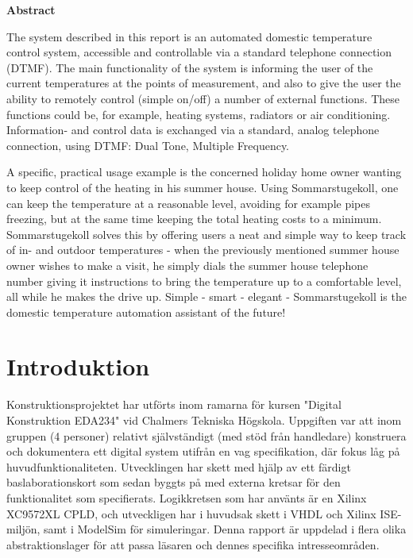 \documentclass[a4paper,11pt]{article}
\begin{document}

\begin{center}
{\noindent \bf Abstract}
\end{center}


	The system described in this report is an automated domestic temperature control system, accessible and controllable via
	a standard telephone connection (DTMF). The main functionality of the system is informing the user of the current temperatures
	at the points of measurement, and also to give the user the ability to remotely control (simple on/off) a number of external
	functions. These functions could be, for example, heating systems, radiators or air conditioning. Information- and control data
	is exchanged via a standard, analog telephone connection, using DTMF: Dual Tone, Multiple Frequency.

	A specific, practical usage example is the concerned holiday home owner wanting to keep control of the heating in his summer house.
	Using Sommarstugekoll, one can keep the temperature at a reasonable level, avoiding for example pipes freezing, but at the same time
	keeping the total heating costs to a minimum. Sommarstugekoll solves this by offering users a neat and simple way to keep track
	of in- and outdoor temperatures - when the previously mentioned summer house owner wishes to make a visit, he simply dials the
	summer house telephone number giving it instructions to bring the temperature up to a comfortable level, all while he makes
	the drive up. Simple - smart - elegant - Sommarstugekoll is the domestic temperature automation assistant of the future!


\pagebreak

\section{Introduktion}

	Konstruktionsprojektet har utförts inom ramarna för kursen "Digital Konstruktion EDA234" vid Chalmers Tekniska Högskola.
	Uppgiften var att inom gruppen (4 personer) relativt självständigt (med stöd från handledare) konstruera och dokumentera
	ett digital system utifrån en vag specifikation, där fokus låg på huvudfunktionaliteten.
	Utvecklingen har skett med hjälp av ett färdigt baslaborationskort som sedan byggts på med externa kretsar för den funktionalitet
	som specifierats. Logikkretsen som har använts är en Xilinx XC9572XL CPLD, och utveckligen har i huvudsak skett i VHDL och Xilinx ISE-miljön,
	samt i ModelSim för simuleringar. Denna rapport är uppdelad i flera olika abstraktionslager för att passa läsaren och dennes specifika intresseområden. 
\end{document}

